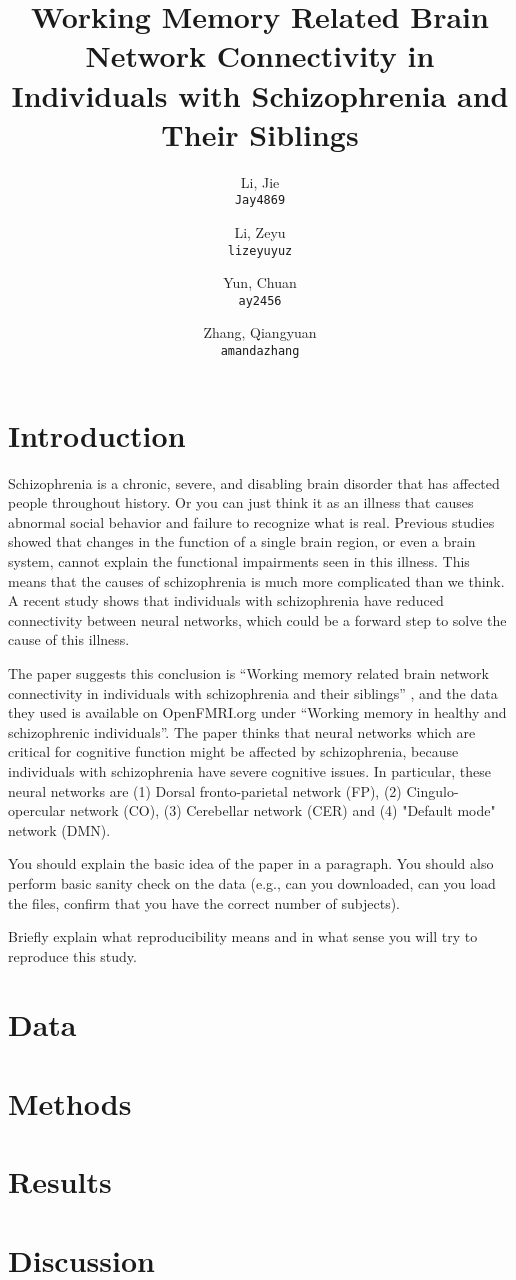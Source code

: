 \documentclass[11pt]{article}
\title{Working Memory Related Brain Network Connectivity in Individuals with Schizophrenia and Their Siblings}
\author{
  Li, Jie\\
  \texttt{Jay4869}
  \and
  Li, Zeyu\\
  \texttt{lizeyuyuz}
  \and
  Yun, Chuan\\
  \texttt{ay2456}
  \and
  Zhang, Qiangyuan\\
  \texttt{amandazhang}
}
\begin{document}
\maketitle


\section{Introduction}

Schizophrenia is a chronic, severe, and disabling brain disorder that has affected people throughout history. Or you can just think it as an illness that causes abnormal social behavior and failure to recognize what is real. Previous studies showed that changes in the function of a single brain region, or even a brain system, cannot explain the functional impairments seen in this illness. This means that the causes of schizophrenia is much more complicated than we think. A recent study shows that individuals with schizophrenia have reduced connectivity between neural networks, which could be a forward step to solve the cause of this illness.

The paper suggests this conclusion is ``Working memory related brain network connectivity in individuals with schizophrenia and their siblings'' \cite{schizophreniabrainconnectivity}, and the data they used is available on OpenFMRI.org under ``Working memory in healthy and schizophrenic individuals''. The paper thinks that neural networks which are critical for cognitive function might be affected by schizophrenia, because individuals with schizophrenia have severe cognitive issues. In particular, these neural networks are (1) Dorsal fronto-parietal network (FP), (2) Cingulo-opercular network (CO), (3) Cerebellar network (CER) and (4) "Default mode" network (DMN). 

You should explain the basic idea of the
paper in a paragraph.  You should also perform basic sanity check on the data
(e.g., can you downloaded, can you load the files, confirm that you have the
correct number of subjects).

Briefly explain what reproducibility means and in what sense you will
try to reproduce this study.

\section{Data}

\section{Methods}
\section{Results}
\section{Discussion}



\end{document}
